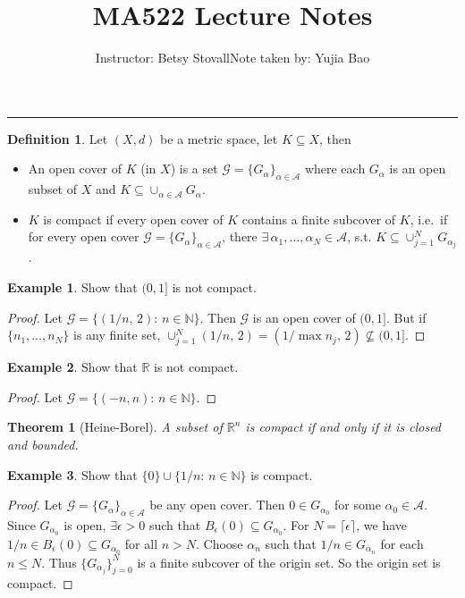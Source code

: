 \documentclass[12pt]{article}
\theoremstyle{plain}
\newtheorem{thm}{Theorem}
\theoremstyle{definition}
\newtheorem*{defn}{Definition}
\newtheorem*{eg}{Example}
\begin{document}
\title{MA522 Lecture Notes}
\author{Instructor: Betsy Stovall\qquad Note taken by: Yujia Bao}
\date{}
\maketitle
\noindent\rule{\textwidth}{1pt}
\begin{defn}
    Let $(X,d)$ be a metric space, let $K\subseteq X$, then
    \begin{itemize}
        \item
            An open cover of $K$ (in $X$) is a set
            $\mathcal{G}=\{G_\alpha\}_{\alpha\in \mathcal{A}}$
        where each $G_\alpha$ is an open subset of $X$ and
        $K\subseteq\cup_{\alpha\in \mathcal{A}}G_{\alpha}$.
        \item
            $K$ is compact if every open cover of $K$ contains a finite subcover
            of $K$, i.e.\ if for every open cover
            $\mathcal{G}=\{G_\alpha\}_{\alpha\in \mathcal{A}}$, there $\exists\,
            \alpha_1,\ldots,\alpha_N\in \mathcal{A}$, s.t. $K\subseteq\cup_{j=1}^N
            G_{\alpha_j}$.
    \end{itemize}
\end{defn}
\begin{eg}
    Show that $(0,1]$ is not compact.
\end{eg}
\begin{proof}
    Let $\mathcal{G}=\{(1/n,\,2):\,n\in\mathbb{N}\}$.
    Then $\mathcal{G}$ is an open cover of $(0,1]$.
    But if $\{n_1,\ldots,n_N\}$ is any finite set,
    $\cup_{j=1}^N(1/n,\,2)=(1/\max n_j,\,2)\nsubseteq (0,1]$.
\end{proof}

\begin{eg}
    Show that $\mathbb{R}$ is not compact.
\end{eg}
\begin{proof}
    Let $\mathcal{G}=\{(-n,n):\,n\in\mathbb{N}\}$.
\end{proof}
\begin{thm}[Heine-Borel]\label{thm:HB}
    A subset of $\mathbb{R}^n$ is compact if and only if it is closed and
    bounded.
\end{thm}


\begin{eg}
    Show that $\{0\}\cup\{1/n:\,n\in\mathbb{N}\}$ is compact.
\end{eg}
\begin{proof}
    Let $\mathcal{G}=\{G_{\alpha}\}_{\alpha\in \mathcal{A}}$ be any open cover.
    Then $0\in G_{\alpha_0}$ for some $\alpha_0\in \mathcal{A}$.
    Since $G_{\alpha_0}$ is open, $\exists \epsilon>0$ such that
    $B_{\epsilon}(0)\subseteq G_{\alpha_0}$.
    For $N=\lceil\epsilon\rceil$, we have $1/n\in B_{\epsilon}(0)\subseteq
    G_{\alpha_0}$ for all $n>N$.
    Choose $\alpha_n$ such that $1/n\in G_{\alpha_n}$ for each $n\leq N$.
    Thus $\{G_{\alpha_j}\}_{j=0}^N$ is a finite subcover of the origin set.
    So the origin set is compact.
\end{proof}
\end{document}
